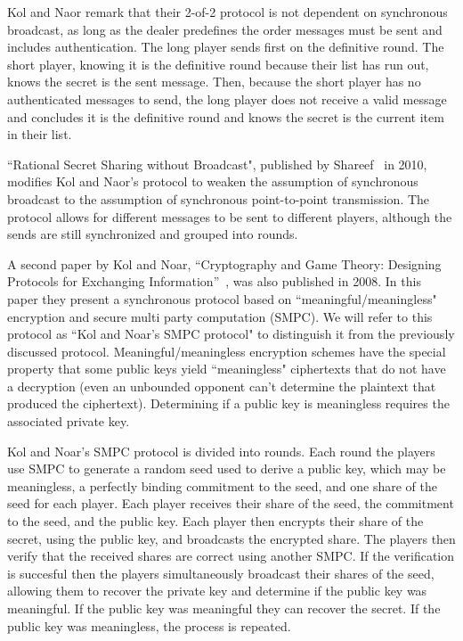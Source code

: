 \documentclass{dalcsthesis}
\begin{document}
Kol and Naor remark that their 2-of-2 protocol is not dependent on synchronous broadcast, as long as the dealer predefines the order messages must be sent and includes authentication. The long player sends first on the definitive round. The short player, knowing it is the definitive round because their list has run out, knows the secret is the sent message. Then, because the short player has no authenticated messages to send, the long player does not receive a valid message and concludes it is the definitive round and knows the secret is the current item in their list.

``Rational Secret Sharing without Broadcast", published by Shareef~\cite{Shareef10} in 2010, modifies Kol and Naor's protocol to weaken the assumption of synchronous broadcast to the assumption of synchronous point-to-point transmission. The protocol allows for different messages to be sent to different players, although the sends are still synchronized and grouped into rounds.

A second paper by Kol and Noar, ``Cryptography and Game Theory: Designing Protocols for Exchanging Information''~\cite{kol08-2}, was also published in 2008. In this paper they present a synchronous protocol based on ``meaningful/meaningless" encryption and secure multi party computation (SMPC). We will refer to this protocol as ``Kol and Noar's SMPC protocol" to distinguish it from the previously discussed protocol. Meaningful/meaningless encryption schemes have the special property that some public keys yield ``meaningless" ciphertexts that do not have a decryption (even an unbounded opponent can't determine the plaintext that produced the ciphertext). Determining if a public key is meaningless requires the associated private key. 

Kol and Noar's SMPC protocol is divided into rounds. Each round the players use SMPC to generate a random seed used to derive a public key, which may be meaningless, a perfectly binding commitment to the seed, and one share of the seed for each player. Each player receives their share of the seed, the commitment to the seed, and the public key. Each player then encrypts their share of the secret, using the public key, and broadcasts the encrypted share. The players then verify that the received shares are correct using another SMPC. If the verification is succesful then the players simultaneously broadcast their shares of the seed, allowing them to recover the private key and determine if the public key was meaningful. If the public key was meaningful they can recover the secret. If the public key was meaningless, the process is repeated.
\end{document}
